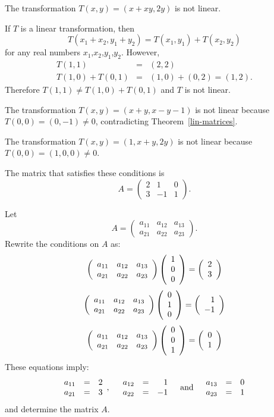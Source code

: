  \ans The transformation $T(x,y) = (x + xy, 2y)$ is not linear.

\soln If $T$ is a linear transformation, then
\[
T(x_1 + x_2,y_1 + y_2) = T(x_1,y_1) + T(x_2,y_2)
\]
for any real numbers $x_1$,$x_2$,$y_1$,$y_2$.  However,
\[
\begin{array}{rcl}
T(1,1) & = & (2,2) \\
T(1,0) + T(0,1) & = & (1,0) + (0,2) = (1,2).\end{array}
\]
Therefore $T(1,1) \neq T(1,0) + T(0,1)$ and $T$ is not linear.

 The transformation $T(x,y) = (x + y, x - y - 1)$
is not linear because $T(0,0) = (0,-1) \neq 0$, contradicting
Theorem~\ref{lin-matrices}.

 The transformation $T(x,y) = (1,x + y, 2y)$ is not linear
because $T(0,0) = (1,0,0) \neq 0$.

\ans The matrix that satisfies these conditions is
\[
A = \left(\begin{array}{rrr} 2 & 1 & 0 \\ 3 & -1 & 1
\end{array}\right).
\]

\soln Let
\[
A = \left(\begin{array}{rrr}
a_{11} & a_{12} & a_{13} \\ a_{21} & a_{22} & a_{23}
\end{array}\right).
\]
Rewrite the conditions on $A$ as:
\[
\left(\begin{array}{rrr}
a_{11} & a_{12} & a_{13} \\ a_{21} & a_{22} & a_{23}
\end{array}\right) \left(\begin{array}{r} 1 \\ 0 \\ 0\end{array}\right) = \left(\begin{array}{r} 2 \\ 3\end{array}\right)
\]
\[
\left(\begin{array}{rrr}
a_{11} & a_{12} & a_{13} \\ a_{21} & a_{22} & a_{23}
\end{array}\right) \left(\begin{array}{r} 0 \\ 1 \\ 0\end{array}\right) = \left(\begin{array}{r} 1 \\ -1\end{array}\right)
\]
\[
\left(\begin{array}{rrr}
a_{11} & a_{12} & a_{13} \\ a_{21} & a_{22} & a_{23}
\end{array}\right) \left(\begin{array}{r} 0 \\ 0 \\ 1\end{array}\right) = \left(\begin{array}{r} 0 \\ 1\end{array}\right)
\]
These equations imply:
\[ \begin{array}{rcl} a_{11} & = & 2 \\ a_{21} & = & 3 \end{array},
\quad
\begin{array}{rcr} a_{12} & = & 1 \\ a_{22} & = & -1 \end{array}
\quad\mbox{and}\quad
\begin{array}{rcl} a_{13} & = & 0 \\ a_{23} & = & 1 \end{array}
\]
and determine the matrix $A$.

